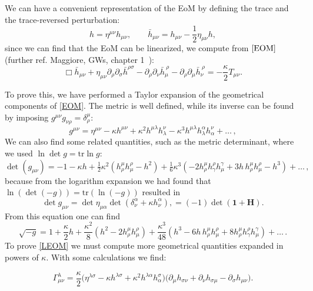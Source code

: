 \documentclass[12pt,a4paper,oneside]{article}
\numberwithin{equation}{section}   %
\begin{document}
We can have a convenient representation of the EoM by defining the trace and the 
trace-reversed perturbation:
\begin{equation}
h = \eta^{\mu\nu} h_{\mu\nu}, \qquad \bar{h}_{\mu\nu}=h_{\mu\nu}-\frac12\eta_{\mu\nu}h,
\end{equation}
since we can find that the EoM can be linearized, 
we compute from $\eqref{EOM}$ (further ref. Maggiore, GWs, chapter 1~\cite{Maggiore2008}):
\begin{equation}\boxed{ 
\Box \bar{h}_{\mu\nu}
+
\eta_{\mu\nu}\partial_\rho\partial_\sigma
\bar{h}^{\rho\sigma}
-
\partial_\rho\partial_\nu \bar{h}_\mu^{\ \rho}
-
\partial_\rho\partial_\mu \bar{h}_\nu^{\ \rho}
=
-\frac{\kappa}{2}T_{\mu\nu}.
}\label{LEOM}\end{equation}

To prove this, we have performed a Taylor expansion of the geometrical components of 
\eqref{EOM}. The metric is well defined, while its inverse can be found by imposing 
$g^{\mu\nu}g_{\nu\rho}=\delta^\mu_\rho$:
\begin{equation}
g^{\mu\nu} = \eta^{\mu\nu} - \kappa h^{\mu\nu} + \kappa^2 h^{\mu\lambda}h^\nu_\lambda - \kappa^3 h^{\mu\lambda}h_\lambda^\alpha h_\alpha^\nu + \dots\,,
\end{equation}
We can also find some related quantities, such as the metric
determinant, where we used $\ln\det g = \mathrm{tr}\ln g$:
\begin{equation}
\det(g_{\mu\nu}) = -1 - \kappa h + \tfrac12\kappa^2(h^\mu_\rho h^\rho_\mu - h^2) + \tfrac16\kappa^3(-2h^\mu_\rho h^\rho_\gamma h^\gamma_\mu + 3h\,h^\mu_\rho h^\rho_\mu - h^3)+\dots \, ,
\end{equation}
because from the logarithm expansion we had found that
$\ln(\det(-g))=\text{tr} (\ln(-g))$ resulted in
\begin{equation}
\det g_{\mu\nu}
= \det\eta_{\mu\alpha}\det(\delta^\alpha_\nu+\kappa h^\alpha_\nu),
= (-1)\det(\mathbf{1+H})  .  
\end{equation}
From this equation one can find
\begin{equation}
\sqrt{-g} = 1 + \frac{\kappa}{2}h + \frac{\kappa^2}{8}(h^2 - 2h^\mu_\rho h^\rho_\mu) + \frac{\kappa^3}{48}(h^3 - 6h\,h^\mu_\rho h^\rho_\mu + 8h^\mu_\rho h^\rho_\gamma h^\gamma_\mu) +\dots\,   .
\end{equation}
To prove \eqref{LEOM} we must compute more geometrical quantities expanded
in powers of $\kappa$. With some calculations we find:


\begin{equation}
\Gamma^\lambda_{\mu\nu} = \frac{\kappa}{2}\bigl(\eta^{\lambda\sigma} - \kappa h^{\lambda\sigma} + \kappa^2 h^{\lambda\alpha}h_\alpha^\sigma\bigr)\bigl(\partial_\mu h_{\sigma\nu} + \partial_\nu h_{\sigma\mu} - \partial_\sigma h_{\mu\nu}\bigr).
\end{equation}
\end{document}
